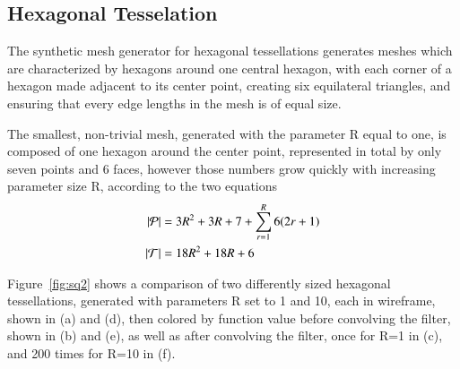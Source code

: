 %
%
%
%
\pagebreak
\subsection{Hexagonal Tesselation}
The synthetic mesh generator for hexagonal tessellations generates meshes which are characterized by hexagons around one central hexagon, with each corner of a hexagon made adjacent to its center point, creating six equilateral triangles, and ensuring that every edge lengths in the mesh is of equal size.

The smallest, non-trivial mesh, generated with the parameter R equal to one, is composed of one hexagon around the center point, represented in total by only seven points and 6 faces, however those numbers grow quickly
with increasing parameter size R, according to the two equations
\begin{align}
	|\mathcal{P}| &= 3R^2 + 3R + 7 +\sum_{r=1}^R{6(2r + 1)}\\
	|\mathcal{T}| &= 18R^2 + 18R + 6
	\label{eq:hexPointAndFaceCounts}
\end{align}


Figure~\ref{fig:sq2} shows a comparison of two differently sized hexagonal tessellations, generated with parameters R set to 1 and 10, each in wireframe, shown in (a) and (d), then colored by function value before convolving the filter, shown in (b) and (e), as well as after convolving the filter, once for R=1 in (c), and 200 times for R=10 in (f).


